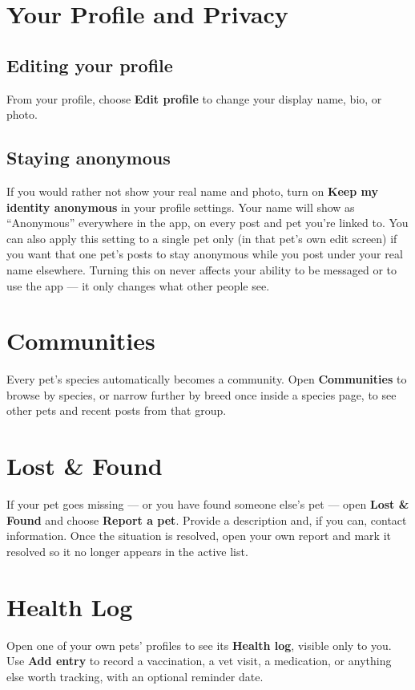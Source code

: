 \documentclass[11pt,a4paper]{article}
\begin{document}
\section{Your Profile and Privacy}
\subsection{Editing your profile}
From your profile, choose \textbf{Edit profile} to change your display name, bio, or
photo.

\subsection{Staying anonymous}
If you would rather not show your real name and photo, turn on \textbf{Keep my
identity anonymous} in your profile settings. Your name will show as ``Anonymous''
everywhere in the app, on every post and pet you're linked to. You can also apply this
setting to a single pet only (in that pet's own edit screen) if you want that one pet's
posts to stay anonymous while you post under your real name elsewhere. Turning this on
never affects your ability to be messaged or to use the app --- it only changes what
other people see.

\section{Communities}
Every pet's species automatically becomes a community. Open \textbf{Communities} to
browse by species, or narrow further by breed once inside a species page, to see other
pets and recent posts from that group.

\section{Lost \& Found}
If your pet goes missing --- or you have found someone else's pet --- open
\textbf{Lost \& Found} and choose \textbf{Report a pet}. Provide a description and, if
you can, contact information. Once the situation is resolved, open your own report and
mark it resolved so it no longer appears in the active list.

\section{Health Log}
Open one of your own pets' profiles to see its \textbf{Health log}, visible only to
you. Use \textbf{Add entry} to record a vaccination, a vet visit, a medication, or
anything else worth tracking, with an optional reminder date.
\end{document}
